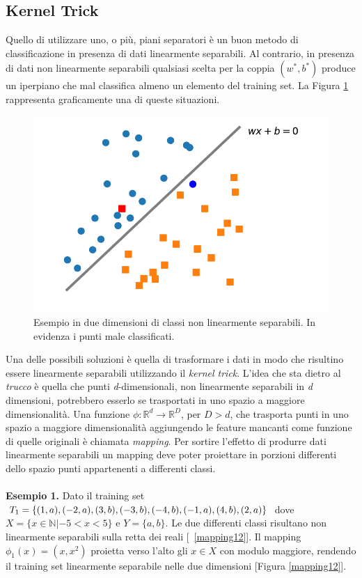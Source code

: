 \documentclass [11pt,a4paper,twoside,openright] {book}
\begin{document}
\subsection{Kernel Trick}
Quello di utilizzare uno, o più, piani separatori è un buon metodo di classificazione in presenza di dati linearmente separabili. Al contrario, in presenza di dati non linearmente separabili qualsiasi scelta per la coppia $(w^*, b^*)$ produce un iperpiano che mal classifica almeno un elemento del training set. La Figura \ref{nonseparabili} rappresenta graficamente una di queste situazioni.
\begin{figure}[!h]
\centering
\includegraphics[scale=.6]{figure/nonseparabili.pdf}
\caption{Esempio in due dimensioni di classi non linearmente separabili. In evidenza i punti male classificati. \label{nonseparabili}}
\end{figure}
Una delle possibili soluzioni è quella di trasformare i dati in modo che risultino essere linearmente separabili utilizzando il \textit{kernel trick}. L'idea che sta dietro al \textit{trucco} è quella che punti \textit{d}-dimensionali, non linearmente separabili in \textit{d} dimensioni, potrebbero esserlo se trasportati in uno spazio a maggiore dimensionalità. Una funzione $\phi: \mathbb{R}^d \rightarrow \mathbb{R}^D$, per $D > d$, che trasporta punti in uno spazio a maggiore dimensionalità aggiungendo le feature mancanti come funzione di quelle originali è chiamata \textit{mapping}. Per sortire l'effetto di produrre dati linearmente separabili un mapping deve poter proiettare in porzioni differenti dello spazio punti appartenenti a differenti classi.\\\\
\textbf{Esempio 1.} Dato il training set $T_1=\lbrace (1,a),(-2,a),(3,b),(-3,b),(-4,b), \linebreak (-1,a),(4,b),(2,a) \rbrace$ dove $X = \lbrace x \in \mathbb{N} | -5 < x < 5 \rbrace$ e $Y=\lbrace a,b \rbrace$. Le due differenti classi risultano non linearmente separabili sulla retta dei reali [\figurename~\ref{mapping12}]. Il mapping $\phi_1(x)=(x,x^2)$ proietta verso l'alto gli $x \in X$ con modulo maggiore, rendendo il training set linearmente separabile nelle due dimensioni [Figura \ref{mapping12}].\\\\
\end{document}
